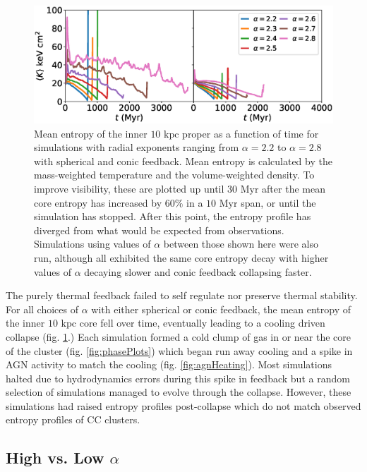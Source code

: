 \documentclass[iop,apjl, twocolappendix]{emulateapj}   %
\begin{document}
\begin{figure}
  \begin{center}
    \includegraphics[width=1\linewidth]{figures/avgCoreEntropies.eps}
  \end{center}
  \caption{
    \label{fig:avgCoreEntropies}
    Mean entropy of the inner $10 \text{ kpc}$ proper as a function of time for
    simulations with radial exponents ranging from $\alpha=2.2$ to $\alpha=2.8$
    with spherical and conic feedback.  Mean entropy is calculated by the
    mass-weighted temperature and the volume-weighted density. To improve
    visibility, these are plotted up until $30 \text{ Myr}$ after the mean core
    entropy has increased by $60\%$ in a $10 \text{ Myr}$ span, or until the
    simulation has stopped. After this point, the entropy profile has diverged
    from what would be expected from observations. Simulations using values of
    $\alpha$ between those shown here were also run, although all exhibited the
    same core entropy decay with higher values of $\alpha$ decaying slower and
    conic feedback collapsing faster.
  }
\end{figure}

The purely thermal feedback failed to self regulate nor preserve thermal
stability. For all choices of $\alpha$ with either spherical or conic feedback,
the mean entropy of the inner $10 \text{ kpc}$ core fell over time, eventually
leading to a cooling driven collapse (fig. \ref{fig:avgCoreEntropies}.) Each
simulation formed a cold clump of gas in or near the core of the cluster (fig.
\ref{fig:phasePlots}) which began run away cooling and a spike in AGN activity
to match the cooling (fig. \ref{fig:agnHeating}). Most simulations halted due
to hydrodynamics errors during this spike in feedback but a random selection of
simulations managed to evolve through the collapse. However, these simulations
had raised entropy profiles post-collapse which do not match observed entropy
profiles of CC clusters.

\subsection{High vs. Low $\alpha$}
\label{sec:high_vs_low_alpha}
\end{document}
